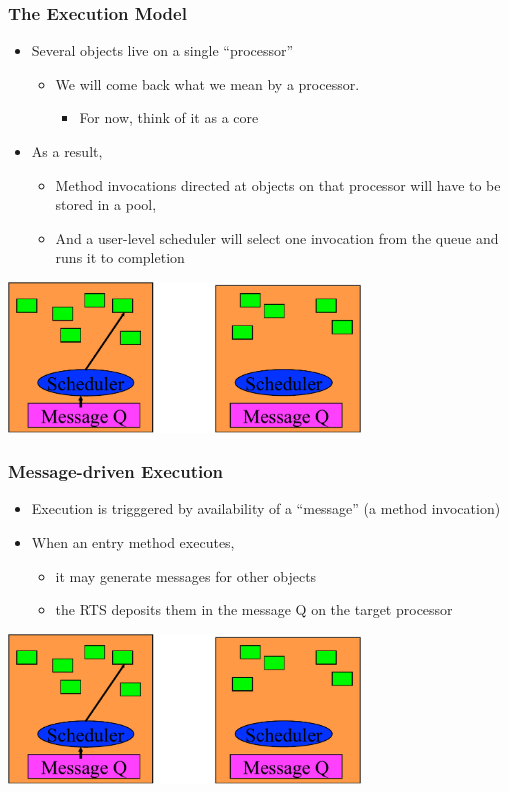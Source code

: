 \begin{frame}[t]
\frametitle{The Execution Model}
  \begin{itemize}
    \item Several objects live on a single ``processor”
    \begin{itemize}
      \item We will come back what we mean by a processor.
      \begin{itemize}
        \item For now, think of it as a core
      \end{itemize}
    \end{itemize}
  \pause
  \item As a result, 
    \begin{itemize}
      \item Method invocations directed at objects on that processor will have to be stored in a pool,
      \pause
      \item And a user-level scheduler will select one invocation from the queue and runs it to completion
    \end{itemize}
  \end{itemize}
  \begin{center} \includegraphics[width=0.7\textwidth]{figures/scheduler} \end{center}
\end{frame}

\begin{frame}[t]
\frametitle{Message-driven Execution}
  \begin{itemize}
    \item Execution is trigggered by availability of a ``message'' (a method invocation)
    \pause
    \item When an entry method executes, 
    \begin{itemize}
      \item it may generate messages for other objects
      \item the RTS deposits them in the message Q on the target processor
    \end{itemize}
  \end{itemize}
  \begin{center} \includegraphics[width=0.7\textwidth]{figures/scheduler} \end{center}
\end{frame}

